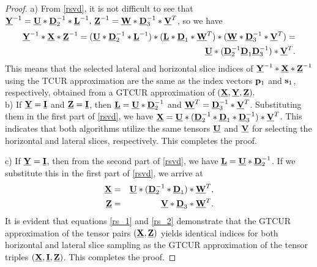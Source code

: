 \documentclass[10pt,a4paper]{amsart}
\newcommand{\I}{{\bf I}}
\newcommand{\cD}{\underline{\bf D}}
\newcommand{\cL}{\underline{\bf L}}
\newcommand{\cU}{\underline{\bf U}}
\newcommand{\cV}{\underline{\bf V}}
\newcommand{\cW}{\underline{\bf W}}
\newcommand{\cX}{\underline{\bf X}}
\newcommand{\cY}{\underline{\bf Y}}
\newcommand{\cZ}{\underline{\bf Z}}
\begin{document}
\begin{proof}
a) From \ref{rsvd}, it is not difficult to see that $\cY^{-1}=\cU*{\cD}_2^{-1}*\cL^{-1},\,\cZ^{-1}=\cW*\cD_3^{-1}*\cV^T$, so we have 
\begin{eqnarray}
\nonumber
\cY^{-1}*\cX*\cZ^{-1}=(\cU*{\cD}_2^{-1}*\cL^{-1})*(\cL*\cD_1*\cW^T)*(\cW*\cD_3^{-1}*\cV^T)=\\\label{prf}
\cU*(\cD_2^{-1}\cD_1\cD_3^{-1})*\cV^T.
\end{eqnarray}
This means that the selected lateral and horizontal slice indices of $\cY^{-1}*\cX*\cZ^{-1}$ using the TCUR approximation are the same as the index vectors ${\bf p}_1$ and ${\bf s}_1$, respectively, obtained from a GTCUR approximation of $(\cX,\cY,\cZ).$\\

b) If $\cY=\underline{\I}$ and $\cZ=\underline{\I}$, then $\cL=\cU*{\cD}_2^{-1}$ and $\cW^T=\cD_3^{-1}*\cV^T$. Substituting them in the first part of \eqref{rsvd}, we have $\cX=\cU*(\cD_2^{-1}*\cD_1*\cD_3^{-1})*\cV^T$. This indicates that both algorithms utilize the same tensors $\cU$ and $\cV$  for selecting the horizontal and lateral slices, respectively. This completes the proof.


c) If $\cY=\underline{\I}$, then from the second part of \eqref{rsvd}, we have $\cL=\cU*\cD_2^{-1}$. If we substitute this in the first part of \eqref{rsvd}, we arrive at 
\begin{eqnarray}\label{rs_1}
\cX&=&\cU*(\cD_2^{-1}*\cD_1)*\cW^T,\\\label{rs_2}
\cZ&=&\cV*\cD_3*\cW^T.  
\end{eqnarray}
It is evident that equations \eqref{rs_1} and \eqref{rs_2} demonstrate that the GTCUR approximation of the tensor pairs $(\cX,\cZ)$ yields identical indices for both horizontal and lateral slice sampling as the GTCUR approximation of the tensor triples $(\cX,\underline{\bf I},\cZ)$. This completes the proof.

\end{proof}
\end{document}
